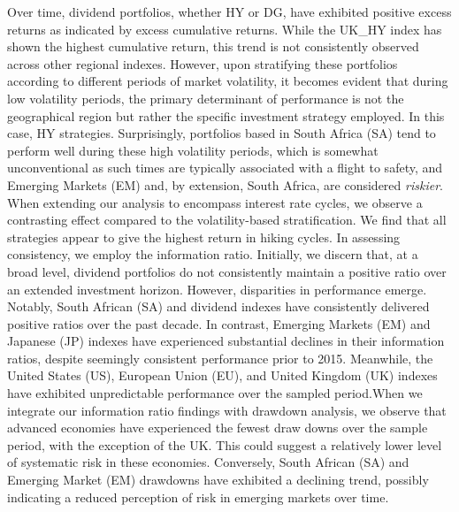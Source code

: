 \documentclass[10pt,preprint, authoryear]{elsarticle}
\numberwithin{equation}{section}
\numberwithin{figure}{section}
\numberwithin{table}{section}
\begin{document}
Over time, dividend portfolios, whether HY or DG, have exhibited
positive excess returns as indicated by excess cumulative returns. While
the UK\_HY index has shown the highest cumulative return, this trend is
not consistently observed across other regional indexes. However, upon
stratifying these portfolios according to different periods of market
volatility, it becomes evident that during low volatility periods, the
primary determinant of performance is not the geographical region but
rather the specific investment strategy employed. In this case, HY
strategies. Surprisingly, portfolios based in South Africa (SA) tend to
perform well during these high volatility periods, which is somewhat
unconventional as such times are typically associated with a flight to
safety, and Emerging Markets (EM) and, by extension, South Africa, are
considered \emph{riskier}. When extending our analysis to encompass
interest rate cycles, we observe a contrasting effect compared to the
volatility-based stratification. We find that all strategies appear to
give the highest return in hiking cycles. In assessing consistency, we
employ the information ratio. Initially, we discern that, at a broad
level, dividend portfolios do not consistently maintain a positive ratio
over an extended investment horizon. However, disparities in performance
emerge. Notably, South African (SA) and dividend indexes have
consistently delivered positive ratios over the past decade. In
contrast, Emerging Markets (EM) and Japanese (JP) indexes have
experienced substantial declines in their information ratios, despite
seemingly consistent performance prior to 2015. Meanwhile, the United
States (US), European Union (EU), and United Kingdom (UK) indexes have
exhibited unpredictable performance over the sampled period.When we
integrate our information ratio findings with drawdown analysis, we
observe that advanced economies have experienced the fewest draw downs
over the sample period, with the exception of the UK. This could suggest
a relatively lower level of systematic risk in these economies.
Conversely, South African (SA) and Emerging Market (EM) drawdowns have
exhibited a declining trend, possibly indicating a reduced perception of
risk in emerging markets over time.
\end{document}
